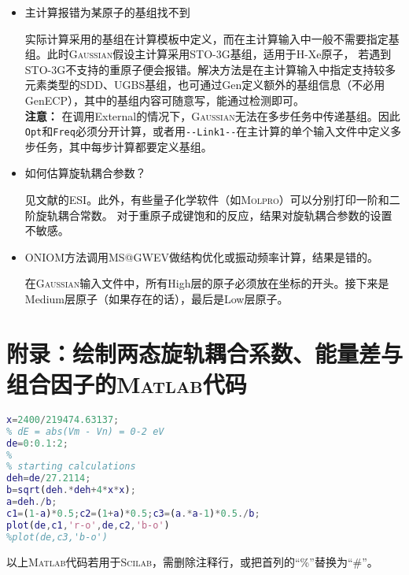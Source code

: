 \documentclass[UTF8]{ctexart}
\begin{document}
\begin{itemize}
\item 主计算报错为某原子的基组找不到

  实际计算采用的基组在计算模板中定义，而在主计算输入中一般不需要指定基组。此时\textsc{Gaussian}假设主计算采用STO-3G基组，适用于H-Xe原子，
  若遇到STO-3G不支持的重原子便会报错。解决方法是在主计算输入中指定支持较多元素类型的\textsf{SDD}、\textsf{UGBS}基组，也可通过\textsf{Gen}定义额外的基组信息（不必用\textsf{GenECP}），其中的基组内容可随意写，能通过检测即可。\\
  \textbf{注意：} 在调用\textsf{External}的情况下，\textsc{Gaussian}无法在多步任务中传递基组。因此\verb|Opt|和\verb|Freq|必须分开计算，或者用\verb|--Link1--|在主计算的单个输入文件中定义多步任务，其中每步计算都要定义基组。

\item 如何估算旋轨耦合参数？

见文献\cite{ref3}的ESI。此外，有些量子化学软件（如\textsc{Molpro}）可以分别打印一阶和二阶旋轨耦合常数。
对于重原子成键饱和的反应，结果对旋轨耦合参数的设置不敏感。

\item \textsf{ONIOM}方法调用MS@GWEV做结构优化或振动频率计算，结果是错的。

在\textsc{Gaussian}输入文件中，所有High层的原子必须放在坐标的开头。接下来是Medium层原子（如果存在的话），最后是Low层原子。

\end{itemize}

\newpage

\appendix

\section{附录：绘制两态旋轨耦合系数、能量差与组合因子的\textsc{Matlab}代码}

\begin{lstlisting}[language=matlab]
% chi = 2400 cm-1
x=2400/219474.63137;
% dE = abs(Vm - Vn) = 0-2 eV
de=0:0.1:2;
%
% starting calculations
deh=de/27.2114;
b=sqrt(deh.*deh+4*x*x);
a=deh./b;
c1=(1-a)*0.5;c2=(1+a)*0.5;c3=(a.*a-1)*0.5./b;
plot(de,c1,'r-o',de,c2,'b-o')
%plot(de,c3,'b-o')
\end{lstlisting}

以上\textsc{Matlab}代码若用于\textsc{Scilab}，需删除注释行，或把首列的“\%”替换为“\#”。
\end{document}
